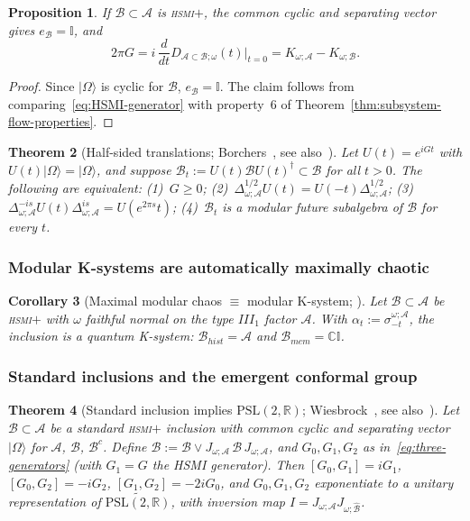 \documentclass[a4paper,11pt]{article}
\newtheorem{theorem}{Theorem}
\newtheorem{corollary}[theorem]{Corollary}
\newtheorem{proposition}[theorem]{Proposition}
\theoremstyle{definition}
\theoremstyle{remark}
\newcommand{\id}{\mathbb{I}}
\newcommand{\mA}{\mathcal{A}}
\newcommand{\mB}{\mathcal{B}}
\newcommand{\PSL}{\mathrm{PSL}(2,\mathbb{R})}
\begin{document}
\begin{proposition}\label{prop:G-is-subsystem-generator}
If $\mB\subset\mA$ is \textsc{hsmi}$+$, the common cyclic and separating vector gives
$e_\mB=\id$, and
\begin{equation}
  2\pi G
  = i\,\frac{d}{dt}D_{\mA\subset\mB;\omega}(t)\Big|_{t=0}
  = K_{\omega;\mA}-K_{\omega;\mB}.
\end{equation}
\end{proposition}
\begin{proof}
Since $|\Omega\rangle$ is cyclic for $\mB$, $e_\mB=\id$.  The claim follows from
comparing~\eqref{eq:HSMI-generator} with property~6 of Theorem~\ref{thm:subsystem-flow-properties}.
\end{proof}
 
\begin{theorem}[Half-sided translations; Borchers~{\cite{Borchers2000}},
see also~{\cite[Thm.~18]{OFLLM2024}}]
\label{thm:half-sided-translations}
Let $U(t)=e^{iGt}$ with $U(t)|\Omega\rangle=|\Omega\rangle$, and suppose
$\mB_t:=U(t)\mB U(t)^\dagger\subset\mB$ for all $t>0$.  The following are equivalent:
(1)~$G\ge0$;\quad
(2)~$\Delta_{\omega;\mA}^{1/2}U(t)=U(-t)\Delta_{\omega;\mA}^{1/2}$;\quad
(3)~$\Delta_{\omega;\mA}^{-is}U(t)\Delta_{\omega;\mA}^{is}=U(e^{2\pi s}t)$;\quad
(4)~$\mB_t$ is a modular future subalgebra of $\mB$ for every $t$.
\end{theorem}
 
\subsubsection*{Modular K-systems are automatically maximally chaotic}
 
\begin{corollary}[Maximal modular chaos $\equiv$ modular K-system;
{\cite[Cor.~17]{OFLLM2024}}]
\label{cor:maximal-chaos-K-system}
Let $\mB\subset\mA$ be \textsc{hsmi}$+$ with $\omega$ faithful normal on the type
$III_1$ factor $\mA$.  With $\alpha_t:=\sigma_{-t}^{\omega;\mA}$, the inclusion is a
quantum K-system: $\mB_{hist}=\mA$ and $\mB_{mem}=\mathbb{C}\id$.
\end{corollary}
 
\subsubsection*{Standard inclusions and the emergent conformal group}
 
\begin{theorem}[Standard inclusion implies $\PSL$;
Wiesbrock~{\cite{Wiesbrock1993}}, see also~{\cite[Thm.~29, $U=\id$]{LLMO2025}}]
\label{thm:wiesbrock-PSL}
Let $\mB\subset\mA$ be a standard \textsc{hsmi}$+$ inclusion with common cyclic and
separating vector $|\Omega\rangle$ for $\mA$, $\mB$, $\mB^c$.  Define
$\widehat{\mB} := \mB \vee J_{\omega;\mA}\,\mB\,J_{\omega;\mA}$,
and $G_0,G_1,G_2$ as in~\eqref{eq:three-generators} (with $G_1=G$ the HSMI generator).
Then $[G_0,G_1]=iG_1$, $[G_0,G_2]=-iG_2$, $[G_1,G_2]=-2iG_0$,
and $G_0,G_1,G_2$ exponentiate to a unitary representation of $\widetilde{\PSL}$,
with inversion map $I=J_{\omega;\mA}J_{\omega;\widehat{\mB}}$.
\end{theorem}
 
\end{document}
